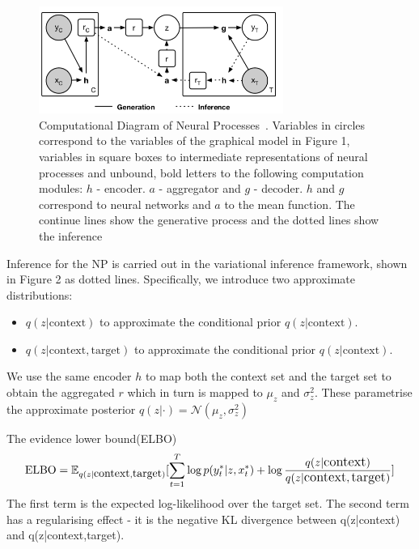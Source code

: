 \documentclass{article}
\begin{document}
\begin{figure}[h!]
  \centering
  \includegraphics[width = 8cm]{computatioanaldiagram_NP.png}
  \caption{Computational Diagram of Neural Processes~\cite{garnelo2018neural}. Variables in circles correspond to the variables of the graphical model in Figure 1, variables in square boxes to intermediate representations of neural processes and unbound, bold letters to the following computation modules: $h$ - encoder. $a$ - aggregator and $g$ - decoder. $h$ and $g$ correspond to neural networks and $a$ to the mean function. The continue lines show the generative process and the dotted lines show the inference}
\end{figure}



Inference for the NP is carried out in the variational inference framework, shown in Figure 2 as dotted lines. Specifically, we introduce two approximate distributions:
\begin{itemize}
\item $q(z|\mbox{context})$ to approximate the conditional prior $q(z|\mbox{context})$.
\item $q(z|\mbox{context}, \mbox{target})$ to approximate the conditional prior $q(z|\mbox{context})$.
\end{itemize}
We use the same encoder $h$ to map both the context set and the target set to obtain the aggregated $r$ which in turn is mapped to $\mu_z$  and $\sigma^2_z$. These parametrise  the approximate posterior $q(z|\cdot) = \mathcal{N}(\mu_z,\sigma^2_z)$ 

The evidence lower bound(ELBO)
\begin{equation}
 \mbox{ELBO} = \mathbb{E}_{q(z|\mbox{context},\mbox{target})} \large[\sum_{t=1}^{T} \log p(y_{t}^{*}|z,x_{t}^{*}) + \log \frac{q(z|\mbox{context})}{q(z|\mbox{context},\mbox{target})}\large]
\end{equation}
The first term is the expected log-likelihood over the target set. The second term has a regularising effect - it is the negative KL divergence between q(z|\mbox{context}) and q(z|\mbox{context},\mbox{target}). 
\end{document}
